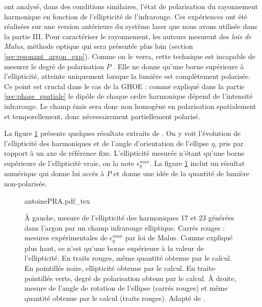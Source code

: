  ont analysé, dans des conditions similaires, l'état de polarisation du rayonnement harmonique en fonction de l'ellipticité de l'infrarouge. Ces expériences ont été réalisées sur une version antérieure du système laser que nous avons utilisée dans la partie III. Pour caractériser le rayonnement, les auteurs mesurent des \textit{lois de Malus}, méthode optique qui sera présentée plus loin (section \ref{sec:resonant_argon_exp}). Comme on le verra, cette technique est incapable de mesurer le degré de polarisation $P$ . Elle ne donne qu'une borne supérieure à l'ellipticité, atteinte uniquement lorsque la lumière est complètement polarisée. Ce point est crucial dans le cas de la GHOE : comme expliqué dans la partie \ref{sec:phase_spatiale} le dipôle de chaque ordre harmonique dépend de l'intensité infrarouge. Le champ émis sera donc non homogène en polarisation spatialement et temporellement, donc nécessairement partiellement polarisé.

La figure \ref{fig:antoinepra} présente quelques résultats extraits de . On y voit l'évolution de l'ellipticité des harmoniques et de l'angle d'orientation de l'ellipse $\eta$, pris par rapport à un axe de référence fixe. L'ellipticité mesurée n'étant qu'une borne supérieure de l'ellipticité vraie, on la note $\epsilon^{max}_q$. La figure \ref{fig:antoinepra} inclut un résultat numérique qui donne lui accès à $P$ et donne une idée de la quantité de lumière non-polarisée.

\begin{figure}[!ht]
\centering
\def\svgwidth{\columnwidth}
{antoinePRA.pdf_tex}
\caption{\`{A} gauche, mesure de l'ellipticité des harmoniques 17 et 23 générées dans l'argon par un champ infrarouge elliptique. Carrés rouges : mesures expérimentales de $\epsilon^{max}_q$ par loi de Malus. Comme expliqué plus haut, ce n'est qu'une borne supérieure à la valeur de l'ellipticité. En traits rouges, même quantité obtenue par le calcul. En pointillés noirs, ellipticité obtenue par le calcul. En traits-pointillés verts, degré de polarisation obtenu par le calcul. \`{A} droite, mesure de l'angle de rotation de l'ellipse (carrés rouges) et même quantité obtenue par le calcul (traits rouges). Adapté de .}
\label{fig:antoinepra}
\end{figure}

